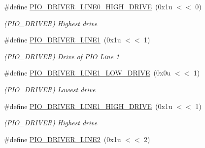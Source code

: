 \begin{DoxyCompactItemize}
\mbox{\label{group__SAMS70__PIO_gae18af59abd02442e0dec363f8127e6e8}} 
\#define \mbox{\hyperlink{group__SAMS70__PIO_gae18af59abd02442e0dec363f8127e6e8}{P\+I\+O\+\_\+\+D\+R\+I\+V\+E\+R\+\_\+\+L\+I\+N\+E0\+\_\+\+H\+I\+G\+H\+\_\+\+D\+R\+I\+VE}}~(0x1u $<$$<$ 0)
\begin{DoxyCompactList}\small\item\em (P\+I\+O\+\_\+\+D\+R\+I\+V\+ER) Highest drive \end{DoxyCompactList}\item 
\mbox{\label{group__SAMS70__PIO_gaabc84f3913a22b25c01a2d984ee3b23e}} 
\#define \mbox{\hyperlink{group__SAMS70__PIO_gaabc84f3913a22b25c01a2d984ee3b23e}{P\+I\+O\+\_\+\+D\+R\+I\+V\+E\+R\+\_\+\+L\+I\+N\+E1}}~(0x1u $<$$<$ 1)
\begin{DoxyCompactList}\small\item\em (P\+I\+O\+\_\+\+D\+R\+I\+V\+ER) Drive of P\+IO Line 1 \end{DoxyCompactList}\item 
\mbox{\label{group__SAMS70__PIO_ga5d5d26e9e59145502a1f2ae79d423825}} 
\#define \mbox{\hyperlink{group__SAMS70__PIO_ga5d5d26e9e59145502a1f2ae79d423825}{P\+I\+O\+\_\+\+D\+R\+I\+V\+E\+R\+\_\+\+L\+I\+N\+E1\+\_\+\+L\+O\+W\+\_\+\+D\+R\+I\+VE}}~(0x0u $<$$<$ 1)
\begin{DoxyCompactList}\small\item\em (P\+I\+O\+\_\+\+D\+R\+I\+V\+ER) Lowest drive \end{DoxyCompactList}\item 
\mbox{\label{group__SAMS70__PIO_ga8ff344092884c5989a56833a084a816c}} 
\#define \mbox{\hyperlink{group__SAMS70__PIO_ga8ff344092884c5989a56833a084a816c}{P\+I\+O\+\_\+\+D\+R\+I\+V\+E\+R\+\_\+\+L\+I\+N\+E1\+\_\+\+H\+I\+G\+H\+\_\+\+D\+R\+I\+VE}}~(0x1u $<$$<$ 1)
\begin{DoxyCompactList}\small\item\em (P\+I\+O\+\_\+\+D\+R\+I\+V\+ER) Highest drive \end{DoxyCompactList}\item 
\mbox{\label{group__SAMS70__PIO_ga4ad0cee6d1444b97947e347f4e7a0440}} 
\#define \mbox{\hyperlink{group__SAMS70__PIO_ga4ad0cee6d1444b97947e347f4e7a0440}{P\+I\+O\+\_\+\+D\+R\+I\+V\+E\+R\+\_\+\+L\+I\+N\+E2}}~(0x1u $<$$<$ 2)
$$
\end{DoxyCompactItemize}
